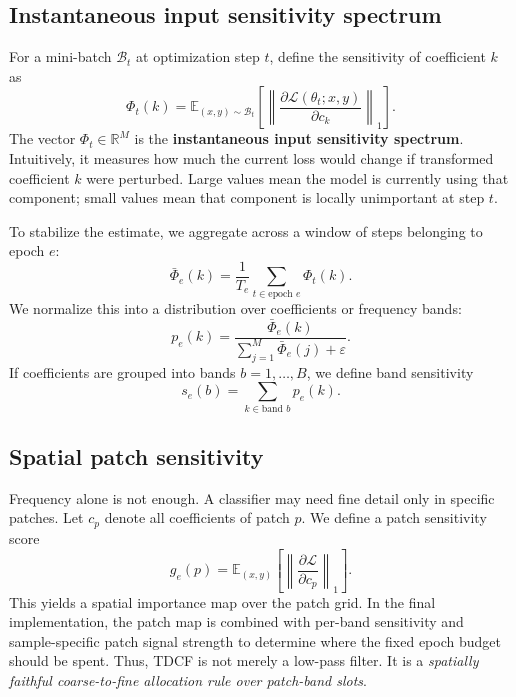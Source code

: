 \documentclass[10pt,twocolumn]{article}
\newcommand{\E}{\mathbb{E}}
\newcommand{\R}{\mathbb{R}}
\newcommand{\B}{\mathcal{B}}
\newcommand{\Lagr}{\mathcal{L}}
\begin{document}
\subsection{Instantaneous input sensitivity spectrum}
For a mini-batch $\B_t$ at optimization step $t$, define the sensitivity of coefficient $k$ as
\begin{equation}
    \Phi_t(k) = \E_{(x,y)\sim\B_t} \left[\left\lVert \frac{\partial \Lagr(\theta_t; x, y)}{\partial c_k}\right\rVert_1\right].
\end{equation}
The vector $\Phi_t \in \R^M$ is the \textbf{instantaneous input sensitivity spectrum}. Intuitively, it measures how much the current loss would change if transformed coefficient $k$ were perturbed. Large values mean the model is currently using that component; small values mean that component is locally unimportant at step $t$.

To stabilize the estimate, we aggregate across a window of steps belonging to epoch $e$:
\begin{equation}
    \bar{\Phi}_e(k) = \frac{1}{T_e} \sum_{t\in\text{epoch }e} \Phi_t(k).
\end{equation}
We normalize this into a distribution over coefficients or frequency bands:
\begin{equation}
    p_e(k) = \frac{\bar{\Phi}_e(k)}{\sum_{j=1}^{M} \bar{\Phi}_e(j) + \varepsilon}.
\end{equation}
If coefficients are grouped into bands $b=1,\dots,B$, we define band sensitivity
\begin{equation}
    s_e(b) = \sum_{k \in \text{band } b} p_e(k).
\end{equation}

\subsection{Spatial patch sensitivity}
Frequency alone is not enough. A classifier may need fine detail only in specific patches. Let $c_p$ denote all coefficients of patch $p$. We define a patch sensitivity score
\begin{equation}
    g_e(p) = \E_{(x,y)}\left[\left\lVert \frac{\partial \Lagr}{\partial c_p}\right\rVert_1\right].
\end{equation}
This yields a spatial importance map over the patch grid. In the final implementation, the patch map is combined with per-band sensitivity and sample-specific patch signal strength to determine where the fixed epoch budget should be spent. Thus, TDCF is not merely a low-pass filter. It is a \emph{spatially faithful coarse-to-fine allocation rule over patch-band slots}.
\end{document}
